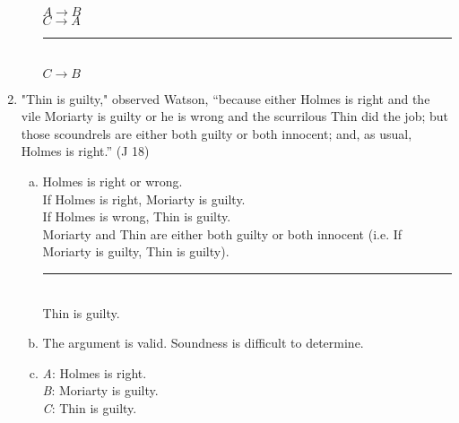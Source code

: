 \documentclass{article}
\begin{document}
\begin{enumerate}
\begin{enumerate}[(a)]
                    $A \to B$\\
                    $C \to A$\\
                    \rule{5em}{.5pt}\\
                    $C \to B$
          \end{enumerate}
    \item "Thin is guilty," observed Watson, “because either Holmes is right and the vile Moriarty is guilty or he is wrong and the scurrilous Thin did the job; but those scoundrels are either both guilty or both innocent; and, as usual, Holmes is right.” (J 18)
          \begin{enumerate}[(a)]
              \item Holmes is right or wrong.\\
                    If Holmes is right, Moriarty is guilty.\\
                    If Holmes is wrong, Thin is guilty.\\
                    Moriarty and Thin are either both guilty or both innocent (i.e. If Moriarty is guilty, Thin is guilty).\\
                    \rule{15em}{.5pt}\\
                    Thin is guilty.
              \item The argument is valid. Soundness is difficult to determine.
              \item \textit{A}: Holmes is right.\\
                    \textit{B}: Moriarty is guilty.\\
                    \textit{C}: Thin is guilty.\\


\end{enumerate}
\end{enumerate}
\end{document}
